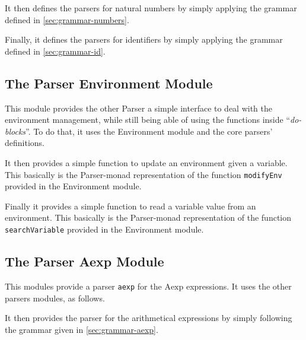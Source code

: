 \documentclass{esposito-documentation}
\begin{document}
It then defines the parsers for natural numbers by simply applying the grammar
defined in \autoref{sec:grammar-numbers}.



Finally, it defines the parsers for identifiers by simply applying the grammar
defined in \autoref{sec:grammar-id}.



\subsection{The Parser Environment Module}


This module provides the other Parser a simple interface to deal with the
environment management, while still being able of using the functions inside
``\emph{do-blocks}''. To do that, it uses the Environment module and the core
parsers' definitions.



It then provides a simple function to update an environment given a variable.
This basically is the Parser-monad representation of the function
\lstinline|modifyEnv| provided in the Environment module.



Finally it provides a simple function to read a variable value from an
environment.  This basically is the Parser-monad representation of the
function \lstinline|searchVariable| provided in the Environment module.



\subsection{The Parser Aexp Module}


This modules provide a parser \lstinline|aexp| for the $\mathrm{Aexp}$
expressions. It uses the other parsers modules, as follows.



It then provides the parser for the arithmetical expressions by simply following
the grammar given in \autoref{sec:grammar-aexp}.
\end{document}
